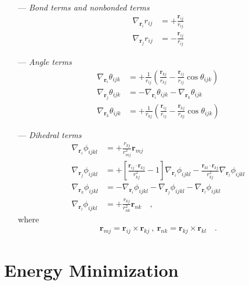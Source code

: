 \documentclass[10pt,a4paper,openany]{memoir}
\numberwithin{equation}{section}
\newcommand{\rsub}[1]{\mathbf{r}_{#1}}
\begin{document}
\begin{itemize}
  \item [---]\textit{Bond terms and nonbonded terms}
  \begin{align}
  \label{eq:distance-gradient}
  \nabla_{\mathbf{r}_i}r_{ij} & = +\frac{\mathbf{r}_{ij}}{r_{ij}} \\ \nonumber
  \nabla_{\mathbf{r}_j}r_{ij} & = -\frac{\mathbf{r}_{ij}}{r_{ij}}
  \end{align}
  \item[---]\textit{Angle terms}
\begin{align}
  \label{eq:angle-gradient}
  \nabla_{\mathbf{r}_i}\theta_{ijk} & = +\frac{1}{r_{ij}}\left( \frac{\rsub{kj}}{r_{kj}} - \frac{\rsub{ij}}{r_{ij}} \cos \theta_{ijk} \right) \\ \nonumber
  \nabla_{\mathbf{r}_j}\theta_{ijk} & = -\nabla_{\mathbf{r}_i}\theta_{ijk}-\nabla_{\mathbf{r}_k}\theta_{ijk} \\ \nonumber
  \nabla_{\mathbf{r}_k}\theta_{ijk} & = +\frac{1}{r_{kj}}\left( \frac{\rsub{ij}}{r_{ij}} - \frac{\rsub{kj}}{r_{kj}} \cos \theta_{ijk} \right)
\end{align}
\item [---]\textit{Dihedral terms}
  \begin{align}
    \label{eq:dihedral-gradient}
    \nabla_{\mathbf{r}_i}\phi_{ijkl} & = +\frac{r_{kj}}{r_{mj}^2}\rsub{mj} \\ \nonumber
    \nabla_{\mathbf{r}_j}\phi_{ijkl} & = +\left[\frac{\rsub{ij}\cdot\rsub{kj}}{r_{kj}^2}- 1\right]\nabla_{\rsub{i}}\phi_{ijkl} - \frac{\rsub{kl}\cdot\rsub{kj}}{r_{kj}^2}\nabla_{\rsub{l}}\phi_{ijkl}\\ \nonumber
    \nabla_{\mathbf{r}_k}\phi_{ijkl} & = -\nabla_{\rsub{i}}\phi_{ijkl} - \nabla_{\rsub{j}}\phi_{ijkl} - \nabla_{\rsub{l}}\phi_{ijkl}\\ \nonumber
    \nabla_{\mathbf{r}_l}\phi_{ijkl} & = +\frac{r_{kj}}{r_{nk}^2}\rsub{nk}  \quad ,
  \end{align}
  where
  \begin{align*}
    \rsub{mj} = \rsub{ij}\times\rsub{kj}\ ,\ \rsub{nk} = \rsub{kj}\times\rsub{kl}\quad .
  \end{align*}
\end{itemize}

\section{Energy Minimization}
\label{chap:minim}
\end{document}
